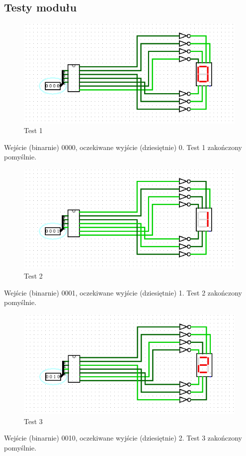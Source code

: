 \subsection{Testy modułu}\label{subsec:module-tests}
\begin{figure}[h]
    \includegraphics[width=\linewidth]{ScreenshotsTests/Comp 1/Comp 1_00009.png}
    \caption{Test 1}
    \label{fig:test0}
\end{figure}
Wejście (binarnie) 0000, oczekiwane wyjście (dziesiętnie) 0.\newline
Test 1 zakończony pomyślnie.

\begin{figure}[H]
    \includegraphics[width=\linewidth]{ScreenshotsTests/Comp 1/Comp 1_00008.png}
    \caption{Test 2}
    \label{fig:test1}
\end{figure}
Wejście (binarnie) 0001, oczekiwane wyjście (dziesiętnie) 1.\newline
Test 2 zakończony pomyślnie.

\begin{figure}[H]
    \includegraphics[width=\linewidth]{ScreenshotsTests/Comp 1/Comp 1_00007.png}
    \caption{Test 3}
    \label{fig:test2}
\end{figure}
Wejście (binarnie) 0010, oczekiwane wyjście (dziesiętnie) 2.\newline
Test 3 zakończony pomyślnie.

